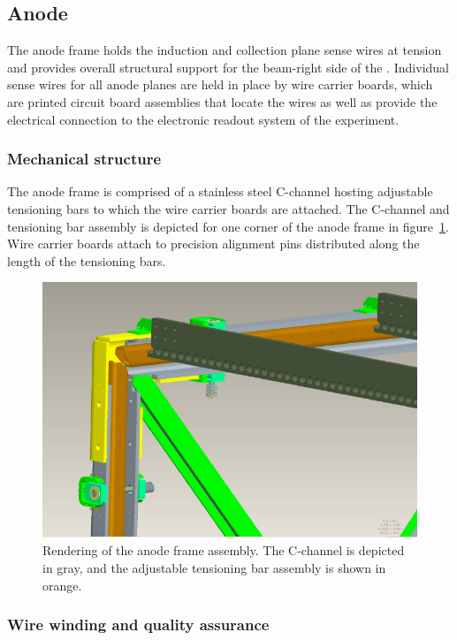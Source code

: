 \subsection{Anode}

The anode frame holds the induction and collection plane sense wires at tension and provides overall structural support for the beam-right side of the \lartpc.  Individual sense wires for all anode planes are held in place by wire carrier boards, which are printed circuit board assemblies that locate the wires as well as provide the electrical connection to the electronic readout system of the experiment.

\subsubsection{Mechanical structure}

The anode frame is comprised of a stainless steel C-channel hosting adjustable tensioning bars to which the wire carrier boards are attached. The C-channel and tensioning bar assembly is depicted for one corner of the anode frame in figure~\ref{fig:anode-frame-3dmodel}.  Wire carrier boards attach to precision alignment pins distributed along the length of the tensioning bars. 

\begin{figure}[htb]
\centering	
\includegraphics[width=0.8\linewidth]{figures/anode-frame-3dmodel.pdf}
\caption{Rendering of the anode frame assembly.  The C-channel is depicted in gray, and the adjustable tensioning bar assembly is shown in orange.}
\label{fig:anode-frame-3dmodel}
\end{figure}

\subsubsection{Wire winding and quality assurance}


